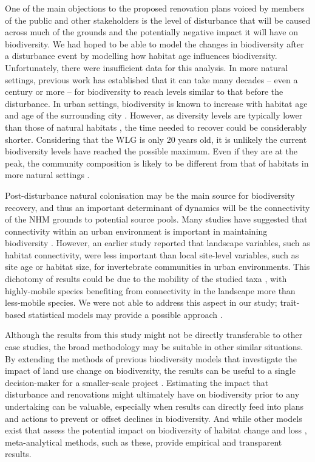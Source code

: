 One of the main objections to the proposed renovation plans voiced by members of the public and other stakeholders is the level of disturbance that will be caused across much of the grounds and the potentially negative impact it will have on biodiversity. We had hoped to be able to model the changes in biodiversity after a disturbance event by modelling how habitat age influences biodiversity. Unfortunately, there were insufficient data for this analysis. In more natural settings, previous work has established that it can take many decades \citep{Hirst:2005jae} -- even a century or more \citep{Vellend:2006ecol} -- for biodiversity to reach levels similar to that before the disturbance. In urban settings, biodiversity is known to increase with habitat age \citep{Yamaguchi:2004er,Sattler:2010le} and age of the surrounding city \citep{Aronson:2014procb}. However, as diversity levels are typically lower than those of natural habitats \citep{Bates:2011po,Ockinger:2009lup}, the time needed to recover could be considerably shorter. Considering that the WLG is only 20 years old, it is unlikely the current biodiversity levels have reached the possible maximum. Even if they are at the peak, the community composition is likely to be different from that of habitats in more natural settings \citep{Angold:2006ste}. 

Post-disturbance natural colonisation may be the main source for biodiversity recovery, and thus an important determinant of dynamics will be the connectivity of the NHM grounds to potential source pools. Many studies have suggested that connectivity within an urban environment is important in maintaining biodiversity \citep{Ockinger:2009lup,Goddard:2010tree,Kong:2010lup,Vergnes:2012bc}. However, an earlier study \citep{Angold:2006ste} reported that landscape variables, such as habitat connectivity, were less important than local site-level variables, such as site age or habitat size, for invertebrate communities in urban environments. This dichotomy of results could be due to the mobility of the studied taxa \citep{Braaker:2014ec}, with highly-mobile species benefiting from connectivity in the landscape more than less-mobile species. We were not able to address this aspect in our study; trait-based statistical models may provide a possible approach \citep[e.g.,][]{Ockinger:2010el,Lizee:2011ei}.

Although the results from this study might not be directly transferable to other case studies, the broad methodology may be suitable in other similar situations. By extending the methods of previous biodiversity models that investigate the impact of land use change on biodiversity, the results can be useful to a single decision-maker for a smaller-scale project \citep[e.g.][]{Newbold:2015nat}. Estimating the impact that disturbance and renovations might ultimately have on biodiversity prior to any undertaking can be valuable, especially when results can directly feed into plans and actions to prevent or offset declines in biodiversity. And while other models exist that assess the potential impact on biodiversity of habitat change and loss \citep[e.g.][]{defra:2012bdo}, meta-analytical methods, such as these, provide empirical and transparent results.

